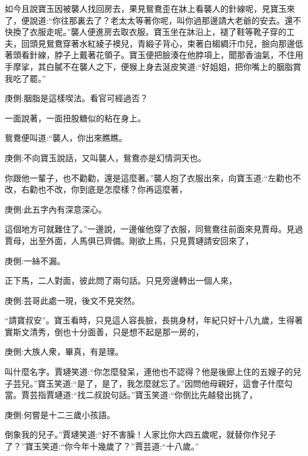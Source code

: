 \begin{parag}
    如今且說寶玉因被襲人找回房去，果見鴛鴦歪在牀上看襲人的針線呢，見寶玉來了，便說道:“你往那裏去了？老太太等著你呢，叫你過那邊請大老爺的安去。還不快換了衣服走呢。”襲人便進房去取衣服。寶玉坐在牀沿上，褪了鞋等靴子穿的工夫，回頭見鴛鴦穿著水紅綾子襖兒，青緞子背心，束著白縐綢汗巾兒，臉向那邊低著頭看針線，脖子上戴著花領子。寶玉便把臉湊在他脖項上，聞那香油氣，不住用手摩挲，其白膩不在襲人之下，便猴上身去涎皮笑道:“好姐姐，把你嘴上的胭脂賞我吃了罷。”\begin{note}庚側:胭脂是這樣喫法。看官可經過否？\end{note}一面說著，一面扭股糖似的粘在身上。
\end{parag}


\begin{parag}
    鴛鴦便叫道:“襲人，你出來瞧瞧。\begin{note}庚側:不向寶玉說話，又叫襲人，鴛鴦亦是幻情洞天也。\end{note}你跟他一輩子，也不勸勸，還是這麼著。”襲人抱了衣服出來，向寶玉道:“左勸也不改，右勸也不改，你到底是怎麼樣？你再這麼著，\begin{note}庚側:此五字內有深意深心。\end{note}這個地方可就難住了。”一邊說，一邊催他穿了衣服，同鴛鴦往前面來見賈母。見過賈母，出至外面，人馬俱已齊備。剛欲上馬，只見賈璉請安回來了，\begin{note}庚側:一絲不漏。\end{note}正下馬，二人對面，彼此問了兩句話。只見旁邊轉出一個人來，\begin{note}庚側:芸哥此處一現，後文不見突然。\end{note}“請寶叔安”。寶玉看時，只見這人容長臉，長挑身材，年紀只好十八九歲，生得著實斯文清秀，倒也十分面善，只是想不起是那一房的，\begin{note}庚側:大族人衆，畢真，有是理。\end{note}叫什麼名字。賈璉笑道:“你怎麼發呆，連他也不認得？他是後廊上住的五嫂子的兒子芸兒。”寶玉笑道:“是了，是了，我怎麼就忘了。”因問他母親好，這會子什麼勾當。賈芸指賈璉道:“找二叔說句話。”寶玉笑道:“你倒比先越發出挑了，\begin{note}庚側:何嘗是十二三歲小孩語。\end{note}倒象我的兒子。”賈璉笑道:“好不害臊！人家比你大四五歲呢，就替你作兒子了？”寶玉笑道:“你今年十幾歲了？”賈芸道:“十八歲。”
\end{parag}


